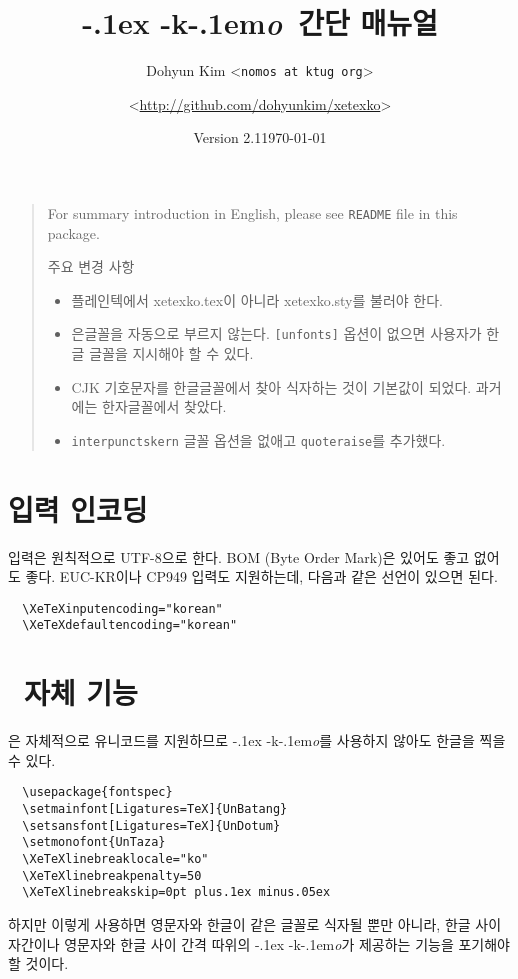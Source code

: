 \documentclass[a4paper]{article}
\def\logoko{\textsf{k}\kern-.1em\textit{o}}
\def\xetexko{\XeTeX\kern-.1ex -\logoko}
\begin{document}
\title{\xetexko\ 간단 매뉴얼}
\author{Dohyun Kim \normalsize <\texttt{nomos at ktug org}> \and
  \normalsize <\url{http://github.com/dohyunkim/xetexko}>}
\date{Version 2.1\quad\today}
\maketitle

\begin{quote}\small
  For summary introduction in English,
  please see \verb+README+ file in this package.

  주요 변경 사항
  \begin{itemize}\itemsep=0pt
      \item 플레인텍에서 xetexko.tex이 아니라 xetexko.sty를 불러야 한다.
    \item 은글꼴을 자동으로 부르지 않는다. \verb+[unfonts]+ 옵션이 없으면
      사용자가 한글 글꼴을 지시해야 할 수 있다.
    \item CJK 기호문자를 한글글꼴에서 찾아 식자하는 것이 기본값이 되었다.
      과거에는 한자글꼴에서 찾았다.
    \item \verb|interpunctskern| 글꼴 옵션을 없애고
      \verb|quoteraise|를 추가했다.
  \end{itemize}
\end{quote}

\section{입력 인코딩}
입력은 원칙적으로 UTF-8으로 한다.
BOM (Byte Order Mark)은 있어도 좋고 없어도 좋다.
EUC-KR이나 CP949 입력도 지원하는데, 다음과 같은 선언이 있으면 된다.
\begin{verbatim}
  \XeTeXinputencoding="korean"
  \XeTeXdefaultencoding="korean"
\end{verbatim}

\section{\XeTeX\ 자체 기능}
\XeTeX 은 자체적으로 유니코드를 지원하므로 \xetexko 를 사용하지
않아도 한글을 찍을 수 있다.
\begin{verbatim}
  \usepackage{fontspec}
  \setmainfont[Ligatures=TeX]{UnBatang}
  \setsansfont[Ligatures=TeX]{UnDotum}
  \setmonofont{UnTaza}
  \XeTeXlinebreaklocale="ko"
  \XeTeXlinebreakpenalty=50
  \XeTeXlinebreakskip=0pt plus.1ex minus.05ex
\end{verbatim}
하지만 이렇게 사용하면 영문자와 한글이 같은 글꼴로 식자될 뿐만 아니라,
한글 사이 자간이나 영문자와 한글 사이 간격 따위의 \xetexko 가 제공하는
기능을 포기해야 할 것이다.
\end{document}
